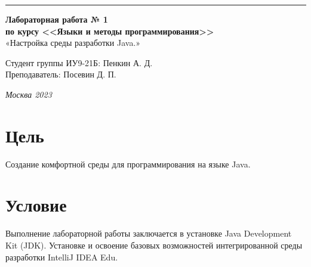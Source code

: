 ﻿\documentclass[a4paper, 12pt]{extarticle}
\begin{document}
\begin{titlepage}
\vspace*{-16pt}
\hspace{30pt}\rule{0.866\textwidth}{0.4pt}
  
\vspace{6em}

\begin{center}
\Large {\bf Лабораторная работа № 1} \\ 
\large {\bf по курсу <<Языки и методы программирования>>} \\ 
\large «Настройка среды разработки Java.» \\
\end{center}\normalsize

\vspace{15em}


\begin{flushright}
  {Студент группы ИУ9-21Б: Пенкин А. Д.\hspace*{15pt} \\
  \vspace{2ex}
  Преподаватель: Посевин Д. П.\hspace*{15pt}}
\end{flushright}

\bigskip

\vfill
 \vspace{7em}

\begin{center}
\textsl{Москва 2023}
\end{center}
\end{titlepage}

\renewcommand{\ttdefault}{pcr}

\setlength{\tabcolsep}{3pt}
\newpage
\setcounter{page}{2}

\section{Цель}\label{Sect::task}
\par
Создание комфортной среды для программирования на языке Java.
\section{Условие}
Выполнение лабораторной работы заключается в установке Java Development Kit (JDK). Установке и освоение базовых возможностей интегрированной среды разработки IntelliJ IDEA Edu.
\end{document}
